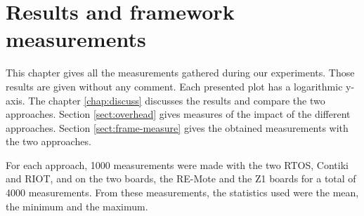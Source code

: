 \chapter{Results and framework measurements \label{chap:results}}

This chapter gives all the measurements gathered during our experiments.
Those results are given without any comment.
Each presented plot has a logarithmic y-axis.
The chapter \ref{chap:discuss} discusses the results and compare the two approaches.
Section \ref{sect:overhead} gives measures of the impact of the different approaches.
Section \ref{sect:frame-measure} gives the obtained measurements with the two approaches.

For each approach, 1000 measurements were made with the two RTOS, Contiki and RIOT, and on the two boards, the RE-Mote and the Z1 boards for a total of 4000 measurements. 
From these measurements, the statistics used were the mean, the minimum and the maximum.



